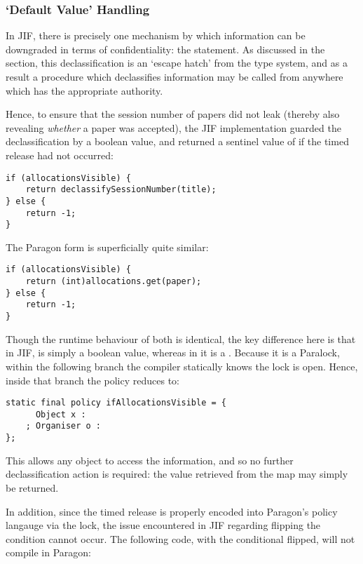 \newpage

\subsubsection{`Default Value' Handling}

In JIF, there is precisely one mechanism by which information can be downgraded in terms of confidentiality: the  statement. As discussed in the  section, this declassification is an `escape hatch' from the type system, and as a result a procedure which declassifies information may be called from anywhere which has the appropriate authority.

Hence, to ensure that the session number of papers did not leak (thereby also revealing \textit{whether} a paper was accepted), the JIF implementation guarded the declassification by a boolean value, and returned a sentinel value of  if the timed release had not occurred:

\begin{verbatim}
if (allocationsVisible) {
	return declassifySessionNumber(title);
} else {
	return -1;
}
\end{verbatim}

The Paragon form is superficially quite similar:

\begin{verbatim}
if (allocationsVisible) {
	return (int)allocations.get(paper);
} else {
	return -1;
}
\end{verbatim}

Though the runtime behaviour of both is identical, the key difference here is that in JIF,  is simply a boolean value, whereas in  it is a . Because it is a Paralock, within the following branch the compiler statically knows the lock is open. Hence, inside that branch the  policy reduces to:

\begin{verbatim}
static final policy ifAllocationsVisible = {
	  Object x : 
	; Organiser o :
};
\end{verbatim}

This allows any object to access the information, and so no further declassification action is required: the value retrieved from the map may simply be returned.

\newpage

In addition, since the timed release is properly encoded into Paragon's policy langauge via the lock, the issue encountered in JIF regarding flipping the condition cannot occur. The following code, with the conditional flipped, will not compile in Paragon:

